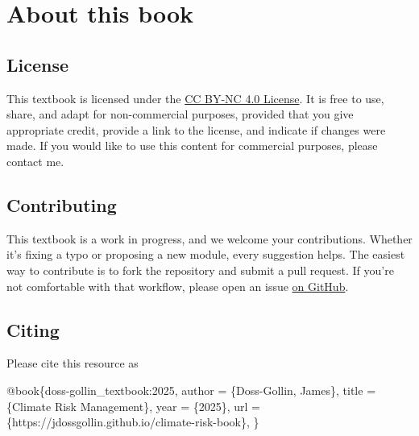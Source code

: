 \documentclass[
  letterpaper,
  DIV=11,
  numbers=noendperiod]{scrreprt}
\newenvironment{Shaded}{\begin{snugshade}}{\end{snugshade}}
\newcommand{\DataTypeTok}[1]{\textcolor[rgb]{0.68,0.00,0.00}{#1}}
\newcommand{\NormalTok}[1]{\textcolor[rgb]{0.00,0.23,0.31}{#1}}
\newcommand{\OtherTok}[1]{\textcolor[rgb]{0.00,0.23,0.31}{#1}}
\newcommand{\VariableTok}[1]{\textcolor[rgb]{0.07,0.07,0.07}{#1}}
\begin{document}
\part{\textbf{About this book}}

\chapter*{License}\label{license}


This textbook is licensed under the
\href{https://creativecommons.org/licenses/by-nc/4.0/}{CC BY-NC 4.0
License}. It is free to use, share, and adapt for non-commercial
purposes, provided that you give appropriate credit, provide a link to
the license, and indicate if changes were made. If you would like to use
this content for commercial purposes, please contact me.

\chapter*{Contributing}\label{contributing}


This textbook is a work in progress, and we welcome your contributions.
Whether it's fixing a typo or proposing a new module, every suggestion
helps. The easiest way to contribute is to fork the repository and
submit a pull request. If you're not comfortable with that workflow,
please open an issue
\href{https://github.com/dossgollin-lab/climate-risk-management-reference/issues}{on
GitHub}.

\chapter*{Citing}\label{citing}


Please cite this resource as

\begin{Shaded}
\begin{Highlighting}[]
\VariableTok{@book}\NormalTok{\{}\OtherTok{doss}\NormalTok{{-}}\OtherTok{gollin\_textbook:2025}\NormalTok{,}
  \DataTypeTok{author}\NormalTok{ = \{Doss{-}Gollin, James\},}
  \DataTypeTok{title}\NormalTok{ = \{Climate Risk Management\},}
  \DataTypeTok{year}\NormalTok{ = \{2025\},}
  \DataTypeTok{url}\NormalTok{ = \{https://jdossgollin.github.io/climate{-}risk{-}book\},}
\NormalTok{\}}
\end{Highlighting}
\end{Shaded}
\end{document}
